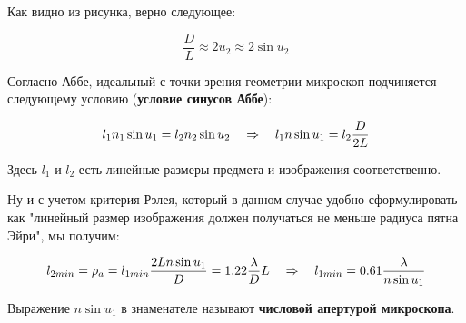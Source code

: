 Как видно из рисунка, верно следующее:

\begin{equation*}
	\frac{D}{L} \approx 2 u_2 \approx 2 \sin u_2
\end{equation*}

Согласно Аббе, идеальный с точки зрения геометрии микроскоп подчиняется следующему условию (\textbf{условие синусов Аббе}):

\begin{equation*}
	l_1 n_1 \sin u_1 = l_2 n_2 \sin u_2 \quad \Rightarrow \quad l_1 n \sin u_1 = l_2 \frac{D}{2L}
\end{equation*}

Здесь $l_1$ и $l_2$ есть линейные размеры предмета и изображения соответственно.

Ну и с учетом критерия Рэлея, который в данном случае удобно сформулировать как "линейный размер изображения должен получаться не меньше радиуса пятна Эйри", мы получим:

\begin{equation*}
	l_{2 min} = \rho_a = l_{1 min} \frac{2 L n\sin u_1}{D} = 1.22 \frac{\lambda}{D} L \quad \Rightarrow \quad l_{1 min} = 0.61 \frac{\lambda}{n\sin u_1}
\end{equation*}

Выражение $n \sin u_1$ в знаменателе называют \textbf{числовой апертурой микроскопа}.